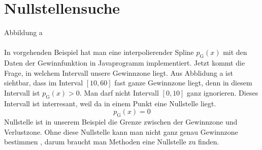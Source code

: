 \chapter{Nullstellensuche}
Abbildung a
\\
\\
In vorgehenden Beispiel hat man eine interpolierender Spline  $p_\textrm{G}(x)$ mit den Daten der Gewinnfunktion in Javaprogramm implementiert.
 Jetzt kommt die Frage, in welchem Intervall unsere Gewinnzone liegt. Aus Abblidung a ist siehtbar, dass im Interval $[10,60]$ fast ganze Gewinnzone liegt, denn in diesem Intervall ist  $p_\textrm{G}(x) > 0$.
Man darf nicht  Intervall $[0,10]$ ganz ignorieren. Dieses Intervall ist interresant, weil da in einem Punkt eine Nullstelle liegt.
$$p_\textrm{G}(x) =0$$
Nullstelle ist in unserem Beispiel die Grenze zwischen der Gewinnzone und Verlustzone. Ohne diese Nullstelle kann man nicht ganz genau Gewinnzone bestimmen , darum braucht man Methoden eine Nullstelle zu finden.

